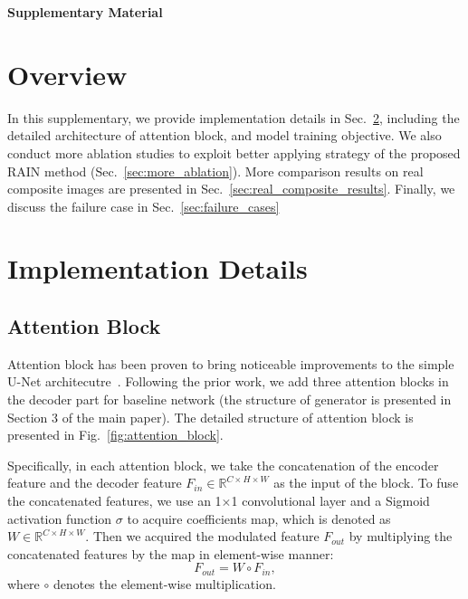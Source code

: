\documentclass[final]{cvpr}
\begin{document}
{\small


}



\appendix

{\Large
\noindent
\newline
\textbf{Supplementary Material}}
\section{Overview}
\label{sec:overview}

In this supplementary, we provide implementation details in Sec.~\ref{sec:implementation}, including the detailed architecture of attention block, and model training objective. We also conduct more ablation studies to exploit better applying strategy of the proposed RAIN method (Sec.~\ref{sec:more_ablation}). More comparison results on real composite images are presented in Sec.~\ref{sec:real_composite_results}. Finally, we discuss the failure case in Sec.~\ref{sec:failure_cases}

\section{Implementation Details}
\label{sec:implementation}



\subsection{Attention Block}
\label{subsec:attention_block}
Attention block has been proven to  bring noticeable improvements to the simple U-Net architecutre~\cite{cong2020dovenet,cun2020improving}. Following the prior work, we add three attention blocks in the decoder part for baseline network (the structure of generator is presented in Section 3 of the main paper). The detailed structure of attention block is presented in Fig.~\ref{fig:attention_block}. 

Specifically, in each attention block, we take the concatenation of the encoder feature and the decoder feature $F_{in}\in{\mathbb{R}^{C\times H\times W}}$ as the input of the block. To fuse the concatenated features, we use an 1$\times$1 convolutional layer and a Sigmoid activation function $\sigma$ to acquire coefficients map, which is denoted as $W\in{\mathbb{R}^{C\times H\times W}}$. Then we acquired the modulated feature $F_{out}$ by multiplying the concatenated features by the map in element-wise manner:
\begin{equation}
\label{equ:exciting}
F_{out} = W\circ F_{in},
\end{equation}
where $\circ$ denotes the element-wise multiplication.
\end{document}
